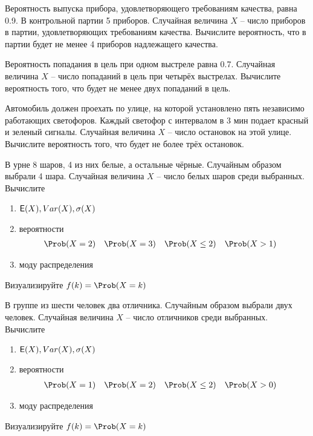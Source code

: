 \begin{exercise}
Вероятность выпуска прибора, удовлетворяющего требованиям качества, равна 0.9.
В контрольной партии 5 приборов. Случайная величина \(X\) -- число приборов в партии,
удовлетворяющих требованиям качества. Вычислите вероятность, что в партии
будет не менее 4 приборов надлежащего качества.
\end{exercise}

\begin{exercise}
Вероятность попадания в цель при одном выстреле равна 0.7. Случайная
величина \(X\) -- число попаданий в цель при четырёх выстрелах.
Вычислите вероятность того, что будет не менее двух попаданий в цель.
\end{exercise}

\begin{exercise}
Автомобиль должен проехать по улице, на которой установлено пять независимо работающих светофоров. 
Каждый светофор с интервалом в 3 мин подает красный и зеленый сигналы. 
Случайная величина \(X\) -- число остановок на этой улице.
Вычислите вероятность того, что будет не более трёх остановок.
\end{exercise}

\begin{exercise}
В урне 8 шаров, 4 из них белые, а остальные чёрные. Случайным образом выбрали 4 шара. 
Случайная величина \(X\) -- число белых шаров среди выбранных. 
Вычислите
\begin{enumerate}
	\item \({\mathsf E}(X), Var(X), \sigma(X)\)
	\item вероятности
	\begin{align*}
		&\Prob(X=2) & &\Prob(X=3) & &\Prob(X\leq2) & &\Prob(X>1)
	\end{align*}
	\item моду распределения
\end{enumerate}
Визуализируйте \(f(k)=\Prob(X=k)\)
\end{exercise}

\begin{exercise}
В группе из шести человек два отличника. Случайным образом выбрали двух человек. 
Случайная величина \(X\) -- число отличников среди выбранных. 
Вычислите
\begin{enumerate}
	\item \({\mathsf E}(X), Var(X), \sigma(X)\)
	\item вероятности
	\begin{align*}
		&\Prob(X=1) & &\Prob(X=2) & &\Prob(X\leq2) & &\Prob(X>0)
	\end{align*}
	\item моду распределения
\end{enumerate}
Визуализируйте \(f(k)=\Prob(X=k)\)
\end{exercise}

